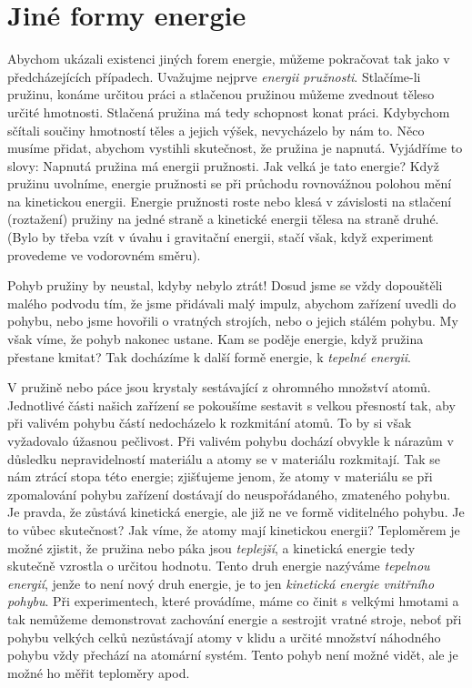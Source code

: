 {  \section{Jiné formy energie}
    Abychom ukázali existenci jiných forem energie, můžeme pokračovat tak jako v předcházejících 
    případech. Uvažujme nejprve \emph{energii pružnosti}. Stlačíme-li pružinu, konáme určitou práci 
    a stlačenou pružinou můžeme zvednout těleso určité hmotnosti. Stlačená pružina má tedy 
    schopnost konat práci. Kdybychom sčítali součiny hmotností těles a jejich výšek, nevycházelo by 
    nám to. Něco musíme přidat, abychom vystihli skutečnost, že pružina je napnutá. Vyjádříme to 
    slovy: Napnutá pružina má energii pružnosti. Jak velká je tato energie? Když pružinu uvolníme, 
    energie pružnosti se při průchodu rovnovážnou polohou mění na kinetickou energii. Energie 
    pružnosti roste nebo klesá v závislosti na stlačení (roztažení) pružiny na jedné straně a 
    kinetické energii tělesa na straně druhé. (Bylo by třeba vzít v úvahu i gravitační energii, 
    stačí však, když experiment provedeme ve vodorovném směru).
    
    Pohyb pružiny by neustal, kdyby nebylo ztrát! Dosud jsme se vždy dopouštěli malého podvodu tím, 
    že jsme přidávali malý impulz, abychom zařízení uvedli do pohybu, nebo jsme hovořili o vratných 
    strojích, nebo o jejich stálém pohybu. My však víme, že pohyb nakonec ustane. Kam se poděje 
    energie, když pružina přestane kmitat? Tak docházíme k další formě energie, k \emph{tepelné 
    energii}.
    
    V pružině nebo páce jsou krystaly sestávající z ohromného množství atomů. Jednotlivé části 
    našich zařízení se pokoušíme sestavit s velkou přesností tak, aby při valivém pohybu částí 
    nedocházelo k rozkmitání atomů. To by si však vyžadovalo úžasnou pečlivost. Při valivém pohybu 
    dochází obvykle k nárazům v důsledku nepravidelností materiálu a atomy se v materiálu 
    rozkmitají. Tak se nám ztrácí stopa této energie; zjišťujeme jenom, že atomy v materiálu se při 
    zpomalování pohybu zařízení dostávají do neuspořádaného, zmateného pohybu. Je pravda, že 
    zůstává kinetická energie, ale již ne ve formě viditelného pohybu. Je to vůbec skutečnost? Jak 
    víme, že atomy mají kinetickou energii? Teploměrem je možné zjistit, že pružina nebo páka jsou 
    \emph{teplejší}, a kinetická energie tedy skutečně vzrostla o určitou hodnotu. Tento druh 
    energie nazýváme \emph{tepelnou energií}, jenže to není nový druh energie, je to jen 
    \emph{kinetická energie vnitřního pohybu}. Při experimentech, které provádíme, máme co činit s 
    velkými hmotami a tak nemůžeme demonstrovat zachování energie a sestrojit vratné stroje, neboť 
    při pohybu velkých celků nezůstávají atomy v klidu a určité množství náhodného pohybu vždy 
    přechází na atomární systém. Tento pohyb není možné vidět, ale je možné ho měřit teploměry apod.
    
}
